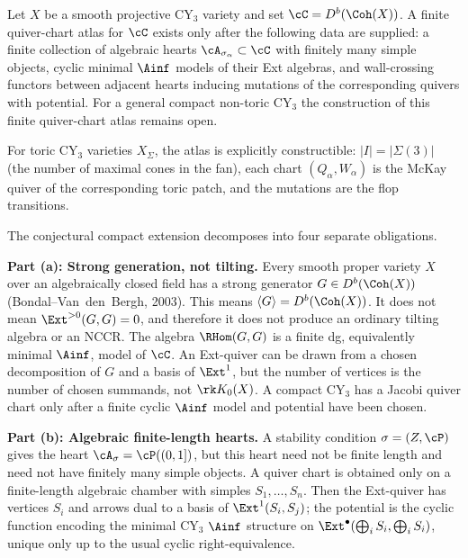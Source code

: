 \begin{conjecture}
\label{conj:tilting-chart-cover}
\ClaimStatusConjectured
Let $X$ be a smooth projective CY$_3$ variety and set
$\cC=D^b(\Coh(X))$. A finite quiver-chart atlas for $\cC$ exists only
after the following data are supplied: a finite collection of algebraic
hearts $\cA_{\sigma_\alpha}\subset \cC$ with finitely many simple
objects, cyclic minimal $\Ainf$ models of their Ext algebras, and
wall-crossing functors between adjacent hearts inducing mutations of
the corresponding quivers with potential. For a general compact
non-toric CY$_3$ the construction of this finite quiver-chart atlas
remains open.

For toric CY$_3$ varieties $X_\Sigma$, the atlas is explicitly constructible: $|I| = |\Sigma(3)|$ (the number of maximal cones in the fan), each chart $(Q_\alpha, W_\alpha)$ is the McKay quiver of the corresponding toric patch, and the mutations are the flop transitions.

\medskip
\noindent The conjectural compact extension decomposes into four
separate obligations.

\medskip
\noindent\textbf{Part (a): Strong generation, not tilting.} Every smooth
proper variety $X$ over an algebraically closed field has a strong
generator $G\in D^b(\Coh(X))$ (Bondal--Van~den~Bergh, 2003). This
means $\langle G\rangle=D^b(\Coh(X))$. It does not mean
$\Ext^{>0}(G,G)=0$, and therefore it does not produce an ordinary
tilting algebra or an NCCR. The algebra
$\RHom(G,G)$ is a finite dg, equivalently minimal $\Ainf$, model of
$\cC$. An Ext-quiver can be drawn from a chosen decomposition of
$G$ and a basis of $\Ext^1$, but the number of vertices is the number
of chosen summands, not $\rk K_0(X)$. A compact CY$_3$ has a Jacobi
quiver chart only after a finite cyclic $\Ainf$ model and potential
have been chosen.

\medskip
\noindent\textbf{Part (b): Algebraic finite-length hearts.} A stability
condition $\sigma=(Z,\cP)$ gives the heart
$\cA_\sigma=\cP((0,1])$, but this heart need not be finite length and
need not have finitely many simple objects. A quiver chart is obtained
only on a finite-length algebraic chamber with simples
$S_1,\ldots,S_n$. Then the Ext-quiver has vertices $S_i$ and arrows
dual to a basis of $\Ext^1(S_i,S_j)$; the potential is the cyclic
function encoding the minimal CY$_3$ $\Ainf$ structure on
$\Ext^\bullet(\bigoplus_i S_i,\bigoplus_i S_i)$, unique only up to the
usual cyclic right-equivalence.


\end{conjecture}
